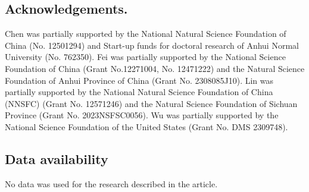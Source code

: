 \documentclass[reqno,11pt]{amsart}
\numberwithin{Thm}{section}
\begin{document}
\medskip



\subsection*{Acknowledgements.}
Chen was partially supported by the National Natural Science Foundation of China (No. 12501294) and Start-up funds for doctoral research of Anhui Normal University (No. 762350). Fei was partially supported by the National Science Foundation of China (Grant No.12271004, No. 12471222) and the Natural Science Foundation of Anhui Province of China (Grant No. 2308085J10). Lin was partially supported by the National Natural Science Foundation of China (NNSFC) (Grant No. 12571246) and the Natural Science Foundation of Sichuan Province (Grant No. 2023NSFSC0056). Wu was partially supported by the
National Science Foundation of the United States (Grant No. DMS 2309748).
\subsection*{Data availability}
No data was used for the research described in the article.
\end{document}
